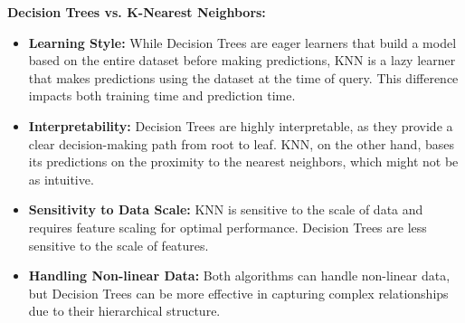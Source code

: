 \documentclass[letterpaper,10pt]{article}
\begin{document}
\textbf{Decision Trees vs. K-Nearest Neighbors:}
\begin{itemize}
\item \textbf{Learning Style:} While Decision Trees are eager learners that build a model based on the entire dataset before making predictions, KNN is a lazy learner that makes predictions using the dataset at the time of query. This difference impacts both training time and prediction time.
\item \textbf{Interpretability:} Decision Trees are highly interpretable, as they provide a clear decision-making path from root to leaf. KNN, on the other hand, bases its predictions on the proximity to the nearest neighbors, which might not be as intuitive.

\item \textbf{Sensitivity to Data Scale:} KNN is sensitive to the scale of data and requires feature scaling for optimal performance. Decision Trees are less sensitive to the scale of features.

\item \textbf{Handling Non-linear Data:} Both algorithms can handle non-linear data, but Decision Trees can be more effective in capturing complex relationships due to their hierarchical structure.
\end{itemize}
\end{document}
